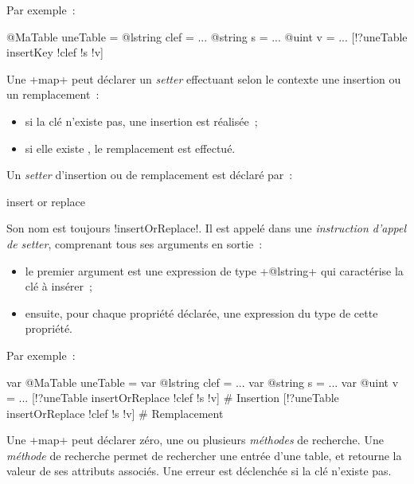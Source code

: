 Par exemple~:
\begin{galgas3}
@MaTable uneTable = {}
@lstring clef = ...
@string s = ...
@uint v = ...
[!?uneTable insertKey !clef !s !v]
\end{galgas3}




Une \ggsq+map+ peut déclarer un \emph{setter} effectuant selon le contexte une insertion ou un remplacement~:
\begin{itemize}
  \item si la clé n'existe pas, une insertion est réalisée~;
  \item si elle existe , le remplacement est effectué.
\end{itemize}

Un \emph{setter} d'insertion ou de remplacement est déclaré par~:

\begin{galgas3}
insert or replace
\end{galgas3}

\begin{galgas4}
\end{galgas4}

Son nom est toujours \ggsq!insertOrReplace!. Il est appelé dans une \emph{instruction d'appel de setter}, comprenant tous ses arguments en sortie~:
\begin{itemize}
  \item le premier argument est une expression de type \ggsq+@lstring+ qui caractérise la clé à insérer~;
  \item ensuite, pour chaque propriété déclarée, une expression du type de cette propriété.
\end{itemize}

Par exemple~:
\begin{galgas3}
var @MaTable uneTable = {}
var @lstring clef = ...
var @string s = ...
var @uint v = ...
[!?uneTable insertOrReplace !clef !s !v] # Insertion
[!?uneTable insertOrReplace !clef !s !v] # Remplacement
\end{galgas3}









Une \ggst+map+ peut déclarer zéro, une ou plusieurs \emph{méthodes} de recherche. Une \emph{méthode} de recherche permet de rechercher une entrée d'une table, et retourne la valeur de ses attributs associés. Une erreur est déclenchée si la clé n'existe pas.


